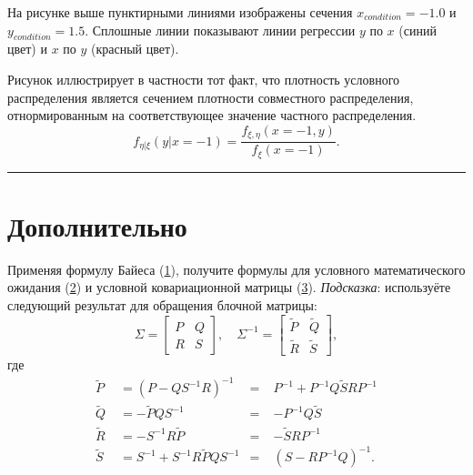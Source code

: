\documentclass[11pt,a4paper]{article}
\begin{document}
    \begin{center}
    \end{center}

    На рисунке выше пунктирными линиями изображены сечения
\(x_{condition} = -1.0\) и \(y_{condition} = 1.5\).
Сплошные линии показывают линии регрессии \(y\) по \(x\) (синий цвет) и
\(x\) по \(y\) (красный цвет).

    Рисунок иллюстрирует в частности тот факт, что плотность условного
распределения является сечением плотности совместного распределения,
отнормированным на соответствующее значение частного распределения. \[
  f_{\eta|\xi}(y|x=-1) = \frac{f_{\xi,\eta}(x=-1, y)}{f_{\xi}(x=-1)}.
\]

    \begin{center}\rule{0.5\linewidth}{0.5pt}\end{center}

    \hypertarget{ux434ux43eux43fux43eux43bux43dux438ux442ux435ux43bux44cux43dux43e}{%
\section{Дополнительно}\label{ux434ux43eux43fux43eux43bux43dux438ux442ux435ux43bux44cux43dux43e}}

Применяя формулу Байеса (\hyperref[mjx-eqn-eqgp_bayes]{1}), получите
формулы для условного математического ожидания
(\hyperref[mjx-eqn-eqgp_mean]{2}) и условной ковариационной матрицы
(\hyperref[mjx-eqn-eqgp_cov]{3}). \emph{Подсказка}: используёте
следующий результат для обращения блочной матрицы: \[
\Sigma =
\begin{bmatrix}
    P & Q \\
    R & S
\end{bmatrix},
\quad
\Sigma^{-1} =
\begin{bmatrix}
    \tilde{P} & \tilde{Q} \\
    \tilde{R} & \tilde{S}
\end{bmatrix},
\] где \[
\begin{aligned}
    \tilde{P} &\;= \left(P-QS^{-1}R\right)^{-1}     & =\;& P^{-1} + P^{-1}Q\tilde{S}RP^{-1} \\
    \tilde{Q} &\;= -\tilde{P}QS^{-1}                & =\;& -P^{-1}Q\tilde{S} \\
    \tilde{R} &\;= -S^{-1}R\tilde{P}                & =\;& -\tilde{S}RP^{-1}  \\
    \tilde{S} &\;= S^{-1} + S^{-1}R\tilde{P}QS^{-1} & =\;& \left(S-RP^{-1}Q\right)^{-1}.
\end{aligned}
\]
\end{document}
